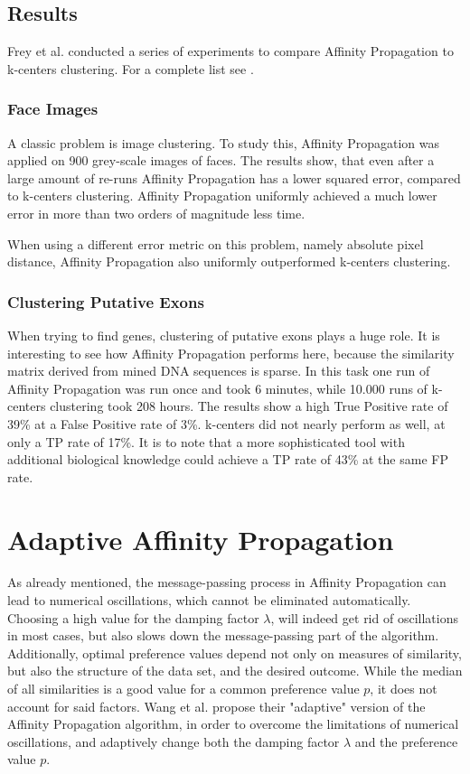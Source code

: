 \documentclass[11pt,a4paper]{article}
\begin{document}
\subsection{Results}
Frey et al. conducted a series of experiments to compare Affinity Propagation to k-centers clustering. For a complete list see \cite{frey2007clustering}.
\subsubsection{Face Images}
A classic problem is image clustering. To study this, Affinity Propagation was applied on 900 grey-scale images of faces. The results show, that even after a large amount of re-runs Affinity Propagation has a lower squared error, compared to k-centers clustering. Affinity Propagation uniformly achieved a much lower error in more than two orders of magnitude less time. \cite{frey2007clustering}

When using a different error metric on this problem, namely absolute pixel distance, Affinity Propagation also uniformly outperformed k-centers clustering. \cite{frey2007clustering}
\subsubsection{Clustering Putative Exons}
When trying to find genes, clustering of putative exons plays a huge role. \cite{frey2007clustering} It is interesting to see how Affinity Propagation performs here, because the similarity matrix derived from mined DNA sequences is sparse. In this task one run of Affinity Propagation was run once and took 6 minutes, while 10.000 runs of k-centers clustering took 208 hours. The results show a high True Positive rate of 39\% at a False Positive rate of 3\%. k-centers did not nearly perform as well, at only a TP rate of 17\%. It is to note that a more sophisticated tool with additional biological knowledge could achieve a TP rate of 43\% at the same FP rate. \cite{frey2007clustering}
\pagebreak
\section{Adaptive Affinity Propagation}
As already mentioned, the message-passing process in Affinity Propagation can lead to numerical oscillations, which cannot be eliminated automatically. Choosing a high value for the damping factor $\lambda$, will indeed get rid of oscillations in most cases, but also slows down the message-passing part of the algorithm. Additionally, optimal preference values depend not only on measures of similarity, but also the structure of the data set, and the desired outcome. While the median of all similarities is a good value for a common preference value $p$, it does not account for said factors. Wang et al. propose their "adaptive" version of the Affinity Propagation algorithm, in order to overcome the limitations of numerical oscillations, and adaptively change both the damping factor $\lambda$ and the preference value $p$. \cite{wang2008adaptive}
\end{document}
